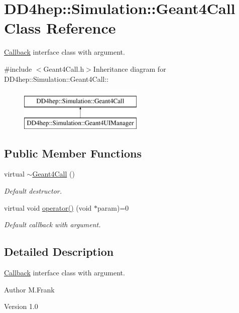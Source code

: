 \hypertarget{class_d_d4hep_1_1_simulation_1_1_geant4_call}{
\section{DD4hep::Simulation::Geant4Call Class Reference}
\label{class_d_d4hep_1_1_simulation_1_1_geant4_call}
}


\hyperlink{class_d_d4hep_1_1_callback}{Callback} interface class with argument.  


{\ttfamily \#include $<$Geant4Call.h$>$}Inheritance diagram for DD4hep::Simulation::Geant4Call::\begin{figure}[H]
\begin{center}
\leavevmode
\includegraphics[height=2cm]{class_d_d4hep_1_1_simulation_1_1_geant4_call}
\end{center}
\end{figure}
\subsection*{Public Member Functions}
\begin{DoxyCompactItemize}
\item 
virtual \hyperlink{class_d_d4hep_1_1_simulation_1_1_geant4_call_ae26b15b06c969e57c214235d31fa754f}{$\sim$Geant4Call} ()
\begin{DoxyCompactList}\small\item\em Default destructor. \item\end{DoxyCompactList}\item 
virtual void \hyperlink{class_d_d4hep_1_1_simulation_1_1_geant4_call_ab55505a1c9fb5e928c995d1312d4158e}{operator()} (void $\ast$param)=0
\begin{DoxyCompactList}\small\item\em Default callback with argument. \item\end{DoxyCompactList}\end{DoxyCompactItemize}


\subsection{Detailed Description}
\hyperlink{class_d_d4hep_1_1_callback}{Callback} interface class with argument. \begin{DoxyAuthor}{Author}
M.Frank 
\end{DoxyAuthor}
\begin{DoxyVersion}{Version}
1.0 
\end{DoxyVersion}


